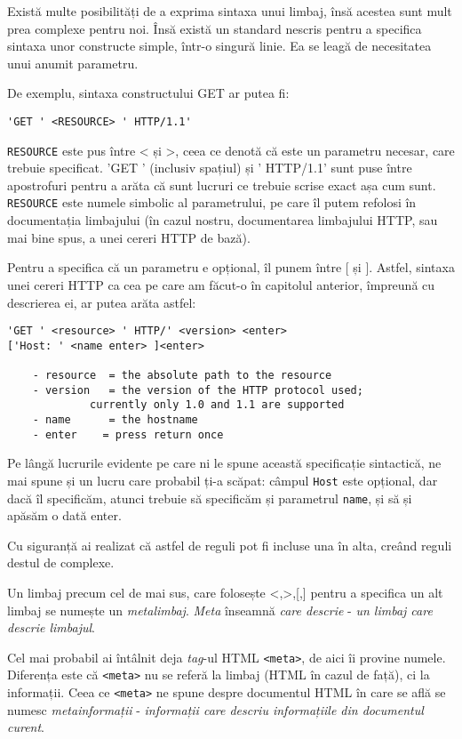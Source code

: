Există multe posibilități de a exprima sintaxa unui limbaj, însă acestea
sunt mult prea complexe pentru noi. Însă există un standard nescris
pentru a specifica sintaxa unor constructe simple, într-o singură linie.
Ea se leagă de necesitatea unui anumit parametru.

De exemplu, sintaxa constructului GET ar putea fi:\\
\begin{verbatim}'GET ' <RESOURCE> ' HTTP/1.1'\end{verbatim}
\texttt{RESOURCE} este pus între < și >, ceea ce denotă că
este un parametru necesar, care trebuie specificat.
'GET ' (inclusiv spațiul) și ' HTTP/1.1' sunt puse
între apostrofuri pentru a arăta că sunt lucruri
ce trebuie scrise exact așa cum sunt. \texttt{RESOURCE}
este numele simbolic al parametrului, pe care îl putem
refolosi în documentația limbajului (în cazul nostru,
documentarea limbajului HTTP, sau mai bine spus, a unei
cereri HTTP de bază).

Pentru a specifica că un parametru e opțional, îl punem între [ și ].
Astfel, sintaxa unei cereri HTTP ca cea pe care am făcut-o în capitolul
anterior, împreună cu descrierea ei, ar putea arăta astfel:
\begin{verbatim}
'GET ' <resource> ' HTTP/' <version> <enter>
['Host: ' <name enter> ]<enter>

	- resource	= the absolute path to the resource
	- version 	= the version of the HTTP protocol used;
             currently only 1.0 and 1.1 are supported
	- name	    = the hostname
	- enter    = press return once
\end{verbatim}

Pe lângă lucrurile evidente pe care ni le spune această specificație
sintactică, ne mai spune și un lucru care probabil ți-a scăpat:
câmpul \texttt{Host} este opțional, dar dacă îl specificăm, atunci
trebuie să specificăm și parametrul \texttt{name}, și să și apăsăm o dată enter.

Cu siguranță ai realizat că astfel de reguli pot fi incluse una în alta,
creând reguli destul de complexe.

Un limbaj precum cel de mai sus, care folosește <,>,[,] pentru a specifica
un alt limbaj se numește un \textsl{metalimbaj}. \textit{Meta} înseamnă
\textit{care descrie} - \textit{un limbaj care descrie limbajul}.



Cel mai probabil ai întâlnit deja \textsl{tag}-ul HTML \texttt{<meta>}, de aici
îi provine numele. Diferența este că \texttt{<meta>} nu se referă la limbaj (HTML
în cazul de față), ci la informații. Ceea ce \texttt{<meta>} ne spune despre
documentul HTML în care se află se numesc \textsl{metainformații} - \textit{informații
care descriu informațiile din documentul curent}.

